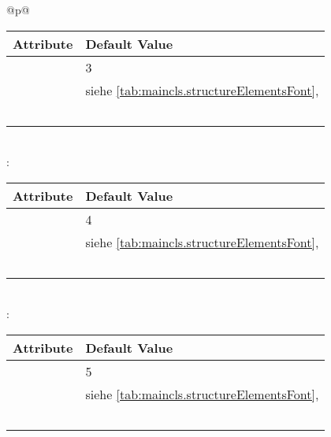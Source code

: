 \begin{longtable}{@{}p{\columnwidth}@{}}
\begin{tabularx}{\linewidth}{ll}
    \toprule
    Attribute & Default Value \\
    \midrule\nopagebreak
    \PValue{level}       & 3 \\
    \PValue{font}        & siehe \autoref{tab:maincls.structureElementsFont}, 
                           \autopageref{tab:maincls.structureElementsFont} \\
    \PValue{indent}      & \PValue{0pt} \\
    \PValue{beforeskip}  & \PValue{-3.25ex plus -1ex minus -.2ex} \\
    \PValue{afterskip}   & \PValue{1.5ex plus .2ex} \\
    \PValue{tocindent}   & \PValue{7.0em}\\
    \PValue{tocnumwidth} & \PValue{4.1em}\\
    \bottomrule
    \end{tabularx} \\
    \addlinespace[\normalbaselineskip]
    : \\*
    \begin{tabularx}{\linewidth}{ll}
    \toprule
    Attribute & Default Value \\
    \midrule\nopagebreak
    \PValue{level}       & 4 \\
    \PValue{font}        & siehe \autoref{tab:maincls.structureElementsFont}, 
                           \autopageref{tab:maincls.structureElementsFont} \\
    \PValue{indent}      & \PValue{0pt} \\
    \PValue{beforeskip}  & \PValue{3.25ex plus 1ex minus .2ex} \\
    \PValue{afterskip}   & \PValue{-1em} \\
    \PValue{tocindent}   & \PValue{10em}\\
    \PValue{tocnumwidth} & \PValue{5em}\\
    \bottomrule
    \end{tabularx} \\
    \addlinespace[\normalbaselineskip]
    :  \\*
    \begin{tabularx}{\linewidth}{ll}
    \toprule
    Attribute & Default Value \\
    \midrule\nopagebreak
    \PValue{level}       & 5 \\
    \PValue{font}        & siehe \autoref{tab:maincls.structureElementsFont}, 
                           \autopageref{tab:maincls.structureElementsFont} \\
    \PValue{indent}      & \Macro{scr@parindent} \\
    \PValue{beforeskip}  & \PValue{3.25ex plus 1ex minus .2ex} \\
    \PValue{afterskip}   & \PValue{-1em} \\
    \PValue{tocindent}   & \PValue{12em}\\
    \PValue{tocnumwidth} & \PValue{6em}\\
    \bottomrule
    \end{tabularx}
  \end{longtable}

